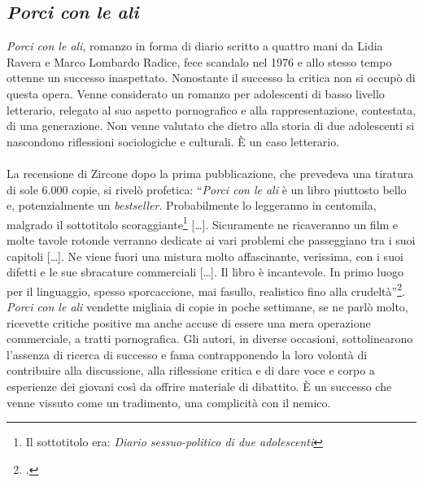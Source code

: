 \subsection{\textbf{\textit{Porci con le ali}}}
\textit{Porci con le ali}, romanzo in forma di diario scritto a quattro mani da Lidia Ravera e Marco Lombardo Radice, fece scandalo nel 1976 e allo stesso tempo ottenne un successo inaspettato.
Nonostante il successo la critica non si occupò di questa opera.
Venne considerato un romanzo per adolescenti di basso livello letterario, relegato al suo aspetto pornografico e alla rappresentazione, contestata, di una generazione.
Non venne valutato che dietro alla storia di due adolescenti si nascondono riflessioni sociologiche e culturali.
È un caso letterario.

\paragraph{}La recensione di Zircone dopo la prima pubblicazione, che prevedeva una tiratura di sole 6.000 copie, si rivelò profetica: \enquote{\textit{Porci con le ali} è un libro piuttosto bello e, potenzialmente un \textit{bestseller}. Probabilmente lo leggeranno in centomila, malgrado il sottotitolo scoraggiante\footnote{Il sottotitolo era: \textit{Diario sessuo-politico di due adolescenti}} […]. Sicuramente ne ricaveranno un film e molte tavole rotonde verranno dedicate ai vari problemi che passeggiano tra i suoi capitoli […]. Ne viene fuori una mistura molto affascinante, verissima, con i suoi difetti e le sue sbracature commerciali […]. Il libro è incantevole. In primo luogo per il linguaggio, spesso sporcaccione, mai fasullo, realistico fino alla crudeltà}\footcite{Zincone}.
\\\textit{Porci con le ali} vendette migliaia di copie in poche settimane, se ne parlò molto, ricevette critiche positive ma anche accuse di essere una mera operazione commerciale, a tratti pornografica.
Gli autori, in diverse occasioni, sottolinearono l'assenza di ricerca di successo e fama contrapponendo la loro volontà di contribuire alla discussione, alla riflessione critica e di  dare voce e corpo a esperienze dei giovani così da offrire materiale di dibattito.
È un successo che venne vissuto come un tradimento, una complicità con il nemico.

